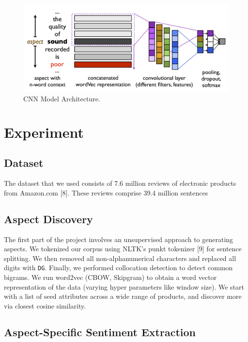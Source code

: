 \documentclass{article} %
\begin{document}
\begin{figure}[ht]
\begin{center}
\includegraphics[width=\columnwidth]{model_architecture.png}
\end{center}
\caption{CNN Model Architecture.}
\label{architecture}
\end{figure}


\section{Experiment} 

\subsection{Dataset}
The dataset that we used consists of 7.6 million reviews of electronic products from Amazon.com [8]. These reviews comprise 39.4 million sentences



\subsection{Aspect Discovery}

The first part of the project involves an unsupervised approach to generating aspects. We tokenized our corpus using NLTK's punkt tokenizer [9] for sentence splitting. We then removed all non-alphanumerical characters and replaced all digits with \texttt{DG}. Finally, we performed collocation detection to detect common bigrams. We run word2vec (CBOW, Skipgram) to obtain a word vector representation of the data (varying hyper parameters like window size). We start with a list of seed attributes across a wide range of products, and discover more via closest cosine similarity.

\subsection{Aspect-Specific Sentiment Extraction}
\end{document}
